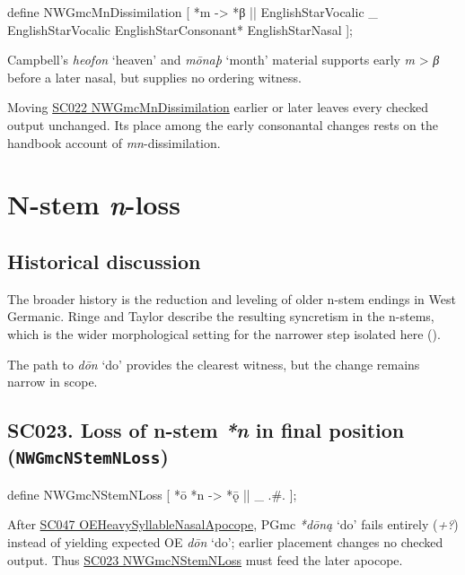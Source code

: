 \documentclass[
  british,
  a4paper,
  openany]{book}
\providecommand{\Recon}[1]{\emph{*#1}}
{\catcode`→=\active \global\def→{\ensuremath{\rightarrow}}}
\providecommand{\texorpdfstring}[2]{#1}
\providecommand{\Recon}[1]{\emph{*#1}}
{\catcode`→=\active \global\def→{\ensuremath{\rightarrow}}}
\begin{document}
\begin{ReaderFacingFoma}
define NWGmcMnDissimilation [
    {*m} -> {*β}
        || EnglishStarVocalic _
           EnglishStarVocalic EnglishStarConsonant* EnglishStarNasal
];
\end{ReaderFacingFoma}

Campbell's \emph{heofon} `heaven' and \emph{mōnaþ} `month' material
supports early \emph{m} \textgreater{} \emph{β} before a later nasal,
but supplies no ordering witness.

Moving \hyperref[rule-NWGmcMnDissimilation]{SC022 NWGmcMnDissimilation}
earlier or later leaves every checked output unchanged. Its place among
the early consonantal changes rests on the handbook account of
\emph{mn}-dissimilation.

\newpage

\section{\texorpdfstring{N-stem
\emph{n}-loss}{N-stem -loss}}\label{n-stem--loss}

\subsection{Historical discussion}\label{historical-discussion-16}

The broader history is the reduction and leveling of older n-stem
endings in West Germanic. Ringe and Taylor describe the resulting
syncretism in the n-stems, which is the wider morphological setting for
the narrower step isolated here ().

The path to \emph{dōn} `do' provides the clearest witness, but the
change remains narrow in scope.

\subsection{\texorpdfstring{SC023. Loss of n-stem \emph{*n} in final
position
(\texttt{NWGmcNStemNLoss})}{SC023. Loss of n-stem  in final position (NWGmcNStemNLoss)}}\label{rule-NWGmcNStemNLoss}

\begin{ReaderFacingFoma}
define NWGmcNStemNLoss [
    {*ō} {*n} -> {*ǭ} || _ .#.
];
\end{ReaderFacingFoma}

After \hyperref[rule-OEHeavySyllableNasalApocope]{SC047
OEHeavySyllableNasalApocope}, PGmc \Recon{dōną} `do' fails entirely
(\emph{+?}) instead of yielding expected OE \emph{dōn} `do'; earlier
placement changes no checked output. Thus
\hyperref[rule-NWGmcNStemNLoss]{SC023 NWGmcNStemNLoss} must feed the
later apocope.
\end{document}
